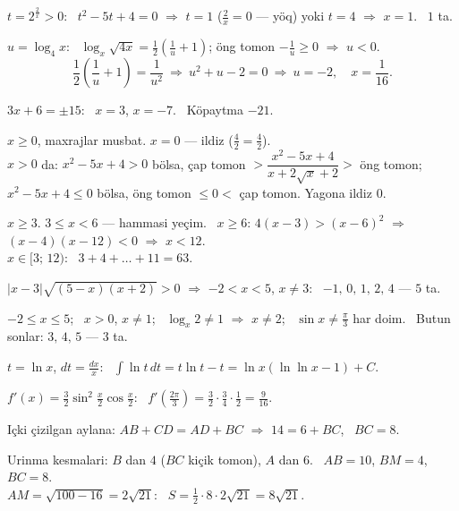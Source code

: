 $t=2^{\frac2x}>0$: \ $t^2-5t+4=0$ $\Rightarrow$ $t=1$ ($\frac2x=0$ — yöq) yoki $t=4$ $\Rightarrow$ $x=1$. \ $1$ ta.

$u=\log_4x$: \ $\log_x\sqrt{4x}=\frac12\left(\frac1u+1\right)$; öng tomon $-\frac1u\ge0$ $\Rightarrow$ $u<0$.
\[\frac12\left(\frac1u+1\right)=\frac1{u^2}\ \Rightarrow\ u^2+u-2=0\ \Rightarrow\ u=-2,\quad x=\frac1{16}.\]

$3x+6=\pm15$: \ $x=3$, $x=-7$. \ Köpaytma $-21$.

$x\ge0$, maxrajlar musbat. $x=0$ — ildiz ($\frac42=\frac42$).\\
$x>0$ da: $x^2-5x+4>0$ bölsa, çap tomon $>\dfrac{x^2-5x+4}{x+2\sqrt x+2}>$ öng tomon; $x^2-5x+4\le0$ bölsa, öng tomon $\le0<$ çap tomon. Yagona ildiz $0$.

$x\ge3$. $3\le x<6$ — hammasi yeçim. \ $x\ge6$: $4(x-3)>(x-6)^2$ $\Rightarrow$ $(x-4)(x-12)<0$ $\Rightarrow$ $x<12$.\\
$x\in[3;\,12)$: \ $3+4+\dots+11=63$.

$|x-3|\sqrt{(5-x)(x+2)}>0$ $\Rightarrow$ $-2<x<5$, $x\ne3$: \ $-1,\,0,\,1,\,2,\,4$ — $5$ ta.

$-2\le x\le5$; \ $x>0$, $x\ne1$; \ $\log_x2\ne1$ $\Rightarrow$ $x\ne2$; \ $\sin x\ne\frac\pi3$ har doim. \ Butun sonlar: $3,\,4,\,5$ — $3$ ta.

$t=\ln x$, $dt=\frac{dx}x$: \ $\displaystyle\int\ln t\,dt=t\ln t-t=\ln x\left(\ln\ln x-1\right)+C$.

$f'(x)=\frac32\sin^2\frac x2\cos\frac x2$: \ $f'\left(\frac{2\pi}3\right)=\frac32\cdot\frac34\cdot\frac12=\frac9{16}$.

Içki çizilgan aylana: $AB+CD=AD+BC$ $\Rightarrow$ $14=6+BC$, \ $BC=8$.

Urinma kesmalari: $B$ dan $4$ ($BC$ kiçik tomon), $A$ dan $6$. \ $AB=10$, $BM=4$, $BC=8$.\\
$AM=\sqrt{100-16}=2\sqrt{21}$: \ $S=\frac12\cdot8\cdot2\sqrt{21}=8\sqrt{21}$.

